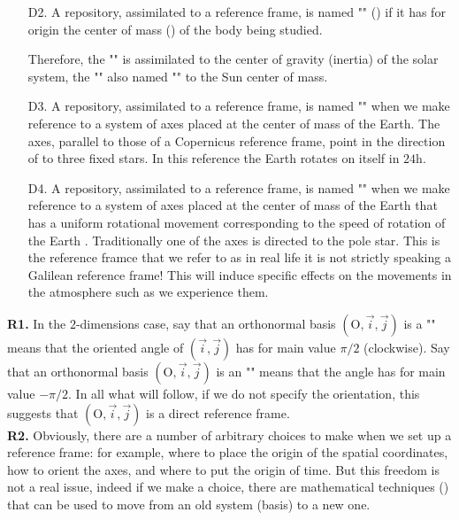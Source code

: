 \begin{enumerate}
		\item[D2.] A repository, assimilated to a reference frame, is named "" () if it has for origin the center of mass () of the body being studied.
		
		Therefore, the "" is assimilated to the center of gravity (inertia) of the solar system, the "" also named "" to the Sun center of mass.
		
		\item[D3.] A repository, assimilated to a reference frame, is named "" when we make reference to a system of axes placed at the center of mass of the Earth. The axes, parallel to those of a Copernicus reference frame, point in the direction of to three fixed stars. In this reference the Earth rotates on itself in $24$h.
		
		\item[D4.] A repository, assimilated to a reference frame, is named "" when we make reference to a system of axes placed at the center of mass of the Earth that has a uniform rotational movement corresponding to the speed of rotation of the Earth . Traditionally one of the axes is directed to the pole star. This is the reference framce that we refer to as in real life it is not strictly speaking a Galilean reference frame! This will induce specific effects on the movements in the atmosphere such as we experience them.
	\end{enumerate}
	\begin{tcolorbox}[title=Remarks,colframe=black,arc=10pt]
	\textbf{R1.} In the $2$-dimensions case, say that an orthonormal basis $(\text{O},\vec{i},\vec{j})$ is a "" means that the oriented angle of $(\vec{i},\vec{j})$ has for main value $\pi/2$ (clockwise). Say that an orthonormal basis  $(\text{O},\vec{i},\vec{j})$ is an "" means that the angle has for main value $-\pi/2$. In all what will follow, if we do not specify the orientation, this suggests that $(\text{O},\vec{i},\vec{j})$ is a direct reference frame.\\
	
	\textbf{R2.} Obviously, there are a number of arbitrary choices to make when we set up a reference frame: for example, where to place the origin of the spatial coordinates, how to orient the axes, and where to put the origin of time. But this freedom is not a real issue, indeed if we make a choice, there are mathematical techniques () that can be used to move from an old system (basis) to a new one.
	\end{tcolorbox}
